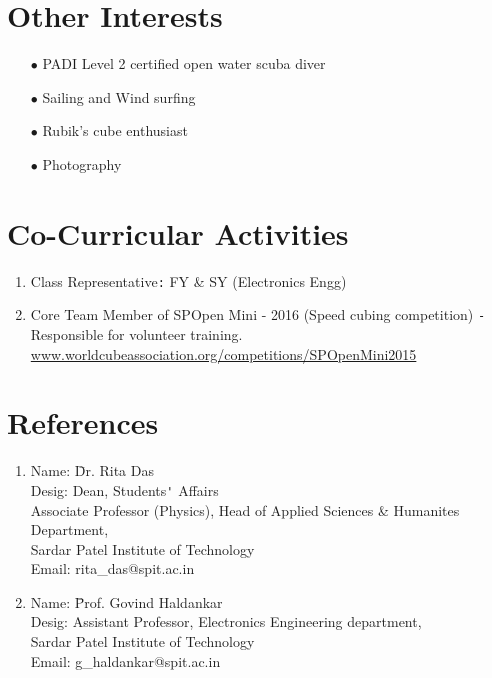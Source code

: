\documentclass{article}
\begin{document}
	\section*{Other Interests}
	\begin{itemize}
		\item[$\bullet$] PADI Level 2 certified open water scuba diver
		\item[$\bullet$] Sailing and Wind surfing
		\item[$\bullet$] Rubik’s cube enthusiast 
		\item[$\bullet$] Photography 
	\end{itemize}
	
	\section*{Co-Curricular Activities}
	\begin{enumerate}
		\item Class Representative\verb|:| FY \& SY (Electronics Engg) 
		\item Core Team Member of SPOpen Mini - 2016 (Speed cubing competition) \verb|-|Responsible for volunteer training.\\
		\url{www.worldcubeassociation.org/competitions/SPOpenMini2015}
	\end{enumerate}
		
	\section*{References}
	\begin{enumerate}
		\item
		\begin{tabbing}
			Name: 		 \=Dr. Rita Das\\ 
			Desig: \>Dean, Students\verb|'| Affairs\\
			\>Associate Professor (Physics), Head of Applied Sciences \& Humanites Department,\\
			\>Sardar Patel Institute of Technology\\
			Email: \>rita\_das@spit.ac.in\\ 
		\end{tabbing}
		
		\item
		\begin{tabbing}
			Name: 	 \=Prof. Govind Haldankar\\
			Desig:
			\>Assistant Professor, Electronics Engineering department,\\
			\>Sardar Patel Institute of Technology\\  
			Email: \>g\_haldankar@spit.ac.in\\ 
		\end{tabbing}	
		
	\end{enumerate}
	
\end{document}
